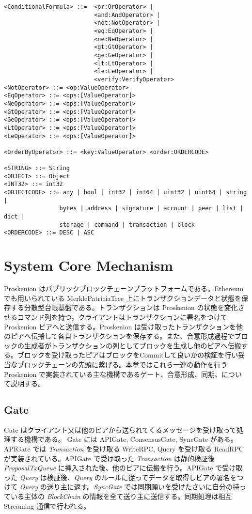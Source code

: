 \begin{verbatim}
<ConditionalFormula> ::=  <or:OrOperator> |
                          <and:AndOperator> |
                          <not:NotOperator> |
                          <eq:EqOperator> |
                          <ne:NeOperator> |
                          <gt:GtOperator> |
                          <ge:GeOperator> |
                          <lt:LtOperator> |
                          <le:LeOperator> |
                          <verify:VerifyOperator>
<NotOperator> ::= <op:ValueOperator>
<EqOperator> ::= <ops:[ValueOperator]>
<NeOperator> ::= <ops:[ValueOperator]>
<GtOperator> ::= <ops:[ValueOperator]>
<GeOperator> ::= <ops:[ValueOperator]>
<LtOperator> ::= <ops:[ValueOperator]>
<LeOperator> ::= <ops:[ValueOperator]>

<OrderByOperator> ::= <key:ValueOperator> <order:ORDERCODE>

<STRING> ::= String
<OBJECT> ::= Object
<INT32> ::= int32
<OBJECTCODE> ::= any | bool | int32 | int64 | uint32 | uint64 | string |
                bytes | address | signature | account | peer | list | dict |
                storage | command | transaction | block
<ORDERCODE> ::= DESC | ASC
\end{verbatim}

\hypertarget{system-core-mechanism}{%
\section{System Core Mechanism}\label{system-core-mechanism}}

Proskenion はパブリックブロックチェーンプラットフォームである。Ethereum
でも用いられている MerklePatriciaTree
上にトランザクションデータと状態を保存する分散型台帳基盤である。トランザクションは
Proskenion
の状態を変化させるコマンド列を持つ。クライアントはトランザクションに署名をつけて
Proskenion ピアへと送信する。Proskenion
は受け取ったトランザクションを他のピアへ伝搬して各自トランザクションを保存する。また、合意形成過程でブロックの生成者がトランザクションの列としてブロックを生成し他のピアへ伝搬する。ブロックを受け取ったピアはブロックをCommitして良いかの検証を行い妥当なブロックチェーンの先頭に繋げる。本章ではこれら一連の動作を行う
Proskenion
で実装されている主な機構であるゲート、合意形成、同期、について説明する。

\hypertarget{gate}{%
\subsection{Gate}\label{gate}}

Gate
はクライアント又は他のピアから送られてくるメッセージを受け取って処理する機構である。
Gate には APIGate, ConsensusGate, SyncGate がある。APIGate では
\emph{Transaction} を受け取る WriteRPC, Query を受け取る ReadRPC
が実装されている。APIGate で受け取った \emph{Transaction} は静的検証後
\emph{ProposalTxQueue} に挿入された後、他のピアに伝搬を行う。APIGate
で受け取った \emph{Query} は検証後、\emph{Query}
のルールに従ってデータを取得しピアの署名をつけて \emph{Query}
の送り主に返す。\emph{SyncGate}
では同期願いを受けたさいに自分の持っている主体の \emph{BlockChain}
の情報を全て送り主に送信する。同期処理は相互 Streaming 通信で行われる。

